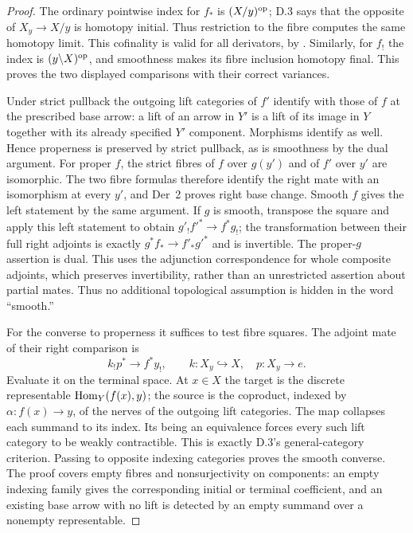 \begin{proof}
The ordinary pointwise index for $f_*$ is $(X/y)^{\mathrm{op}}$; D.3 says that the opposite of $X_y\to X/y$ is homotopy initial. Thus restriction to the fibre computes the same homotopy limit. This cofinality is valid for all derivators, by \citet[Theorems~3.8 and~3.16]{CDGPS2014}. Similarly, for $f_!$ the index is $(y\backslash X)^{\mathrm{op}}$, and smoothness makes its fibre inclusion homotopy final. This proves the two displayed comparisons with their correct variances.

Under strict pullback the outgoing lift categories of $f'$ identify with those of $f$ at the prescribed base arrow: a lift of an arrow in $Y'$ is a lift of its image in $Y$ together with its already specified $Y'$ component. Morphisms identify as well. Hence properness is preserved by strict pullback, as is smoothness by the dual argument. For proper $f$, the strict fibres of $f$ over $g(y')$ and of $f'$ over $y'$ are isomorphic. The two fibre formulas therefore identify the right mate with an isomorphism at every $y'$, and Der~2 proves right base change. Smooth $f$ gives the left statement by the same argument. If $g$ is smooth, transpose the square and apply this left statement to obtain $g'_!f'^*\to f^*g_!$; the transformation between their full right adjoints is exactly $g^*f_*\to f'_*g'^*$ and is invertible. The proper-$g$ assertion is dual. This uses the adjunction correspondence for whole composite adjoints, which preserves invertibility, rather than an unrestricted assertion about partial mates. Thus no additional topological assumption is hidden in the word ``smooth.''

For the converse to properness it suffices to test fibre squares. The adjoint mate of their right comparison is
\[
 k_!p^*\longrightarrow f^*y_!,
 \qquad k:X_y\hookrightarrow X,\quad p:X_y\to e.
\]
Evaluate it on the terminal space. At $x\in X$ the target is the discrete representable $\operatorname{Hom}_Y(f(x),y)$; the source is the coproduct, indexed by $\alpha:f(x)\to y$, of the nerves of the outgoing lift categories. The map collapses each summand to its index. Its being an equivalence forces every such lift category to be weakly contractible. This is exactly D.3's general-category criterion. Passing to opposite indexing categories proves the smooth converse. The proof covers empty fibres and nonsurjectivity on components: an empty indexing family gives the corresponding initial or terminal coefficient, and an existing base arrow with no lift is detected by an empty summand over a nonempty representable.
\end{proof}

